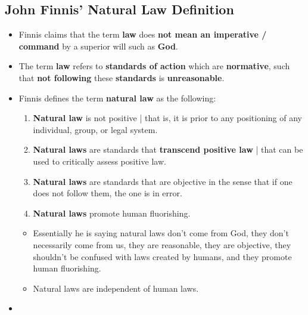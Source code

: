 \documentclass{article}
\begin{document}
    \subsection*{John Finnis' Natural Law Definition}
    \begin{itemize}
        \item Finnis claims that the term \textbf{law} does \textbf{not mean an imperative / command} by a superior will such as \textbf{God}.
        \item The term \textbf{law} refers to \textbf{standards of action} which are \textbf{normative}, such that \textbf{not following} these \textbf{standards} is \textbf{unreasonable}.
        \item Finnis defines the term \textbf{natural law} as the following:
        \begin{enumerate}
            \item \textbf{Natural law} is not positive | that is, it is prior to any positioning of any individual, group, or legal system.
            \item \textbf{Natural laws} are standards that \textbf{transcend positive law} | that can be used to critically assess positive law.
            \item \textbf{Natural laws} are standards that are objective in the sense that if one does not follow them, the one is in error.
            \item \textbf{Natural laws} promote human fluorishing.
        \end{enumerate}
        \begin{itemize}
            \item Essentially he is saying natural laws don't come from God, they don't necessarily come from us, they are reasonable, they are objective, they shouldn't be confused with laws created by humans, and they promote human fluorishing.
            \item Natural laws are independent of human laws.
        \end{itemize}
        \item 
    \end{itemize}
\end{document}
